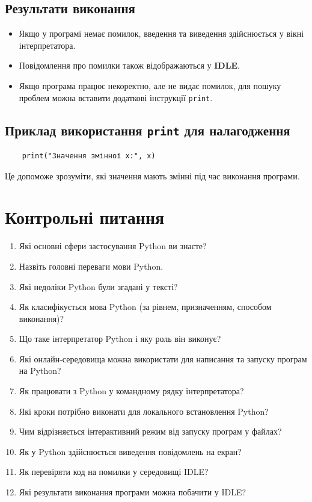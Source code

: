 \subsection*{Результати виконання}

\begin{itemize}
	\item Якщо у програмі немає помилок, введення та виведення здійснюється у вікні інтерпретатора.
	\item Повідомлення про помилки також відображаються у \textbf{IDLE}.
	\item Якщо програма працює некоректно, але не видає помилок, для пошуку проблем можна вставити додаткові інструкції \texttt{print}.
\end{itemize}

\subsection*{Приклад використання \texttt{print} для налагодження}

\begin{verbatim}
	print("Значення змінної x:", x)
\end{verbatim}

Це допоможе зрозуміти, які значення мають змінні під час виконання програми.

\section*{Контрольні питання}

\begin{enumerate}
	\item Які основні сфери застосування Python ви знаєте?
	\item Назвіть головні переваги мови Python.
	\item Які недоліки Python були згадані у тексті?
	\item Як класифікується мова Python (за рівнем, призначенням, способом виконання)?
	\item Що таке інтерпретатор Python і яку роль він виконує?
	\item Які онлайн‑середовища можна використати для написання та запуску програм на Python?
	\item Як працювати з Python у командному рядку інтерпретатора?
	\item Які кроки потрібно виконати для локального встановлення Python?
	\item Чим відрізняється інтерактивний режим від запуску програм у файлах?
	\item Як у Python здійснюється виведення повідомлень на екран?
	\item Як перевіряти код на помилки у середовищі IDLE?
	\item Які результати виконання програми можна побачити у IDLE?

\end{enumerate}
